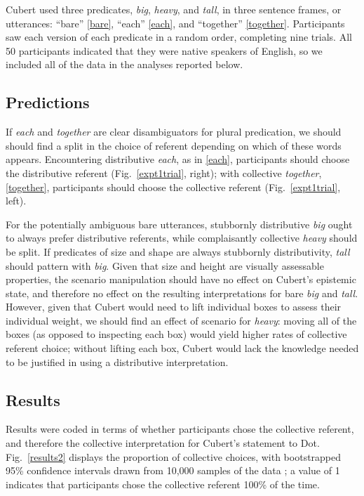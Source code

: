 \documentclass[preprint,12pt,authoryear,titlepage]{elsarticle}
\begin{document}
Cubert used three predicates, \emph{big}, \emph{heavy}, and \emph{tall}, in three sentence frames, or utterances: ``bare'' \ref{bare}, ``each'' \ref{each}, and ``together'' \ref{together}. Participants saw each version of each predicate in a random order, completing nine trials. All 50 participants indicated that they were native speakers of English, so we included all of the data in the analyses reported below.

\subsection{Predictions}

If \emph{each} and \emph{together} are clear disambiguators for plural predication, we should should find a split in the choice of referent depending on which of these words appears. Encountering distributive \emph{each}, as in \ref{each}, participants should choose the distributive referent (Fig.~\ref{expt1trial}, right); with collective \emph{together}, \ref{together}, participants should choose the collective referent (Fig.~\ref{expt1trial}, left). 

For the potentially ambiguous bare utterances, stubbornly distributive \emph{big} ought to always prefer distributive referents, while complaisantly collective \emph{heavy} should be split. If predicates of size and shape are always stubbornly distributivity, \emph{tall} should pattern with \emph{big}. Given that size and height are visually assessable properties, the scenario manipulation should have no effect on Cubert's epistemic state, and therefore no effect on the resulting interpretations for bare \emph{big} and \emph{tall}. 
However, given that Cubert would need to lift individual boxes to assess their individual weight, we should find an effect of scenario for \emph{heavy}: moving all of the boxes (as opposed to inspecting each box) would yield higher rates of collective referent choice; without lifting each box, Cubert would lack the knowledge needed to be justified in using a distributive interpretation.

\subsection{Results}

Results were coded in terms of whether participants chose the collective referent, and therefore the collective interpretation for Cubert's statement to Dot. Fig.\ \ref{results2} displays the proportion of collective choices, with bootstrapped 95\% confidence intervals drawn from 10,000 samples of the data \citep{diciccioefron1996}; a value of 1 indicates that participants chose the collective referent 100\% of the time.
\end{document}
